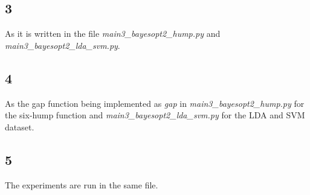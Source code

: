 \documentclass[12pt,a4paper]{article}
\begin{document}
\subsection*{3}
As it is written in the file \textit{main3\_bayesopt2\_hump.py} and \textit{main3\_bayesopt2\_lda\_svm.py}.

\subsection*{4}
As the gap function being implemented as \textit{gap} in \textit{main3\_bayesopt2\_hump.py} for the six-hump function and \textit{main3\_bayesopt2\_lda\_svm.py} for the LDA and SVM dataset.

\subsection*{5}
The experiments are run in the same file.
\end{document}
